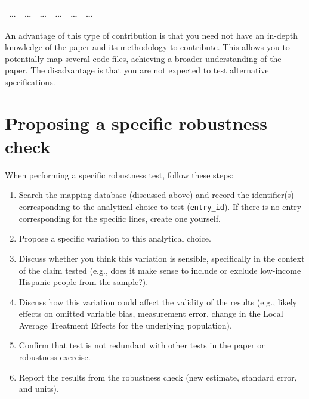 \documentclass[]{book}
\begin{document}
\begin{longtable}[]{@{}lllllll@{}}
\begin{minipage}[t]{0.07\columnwidth}
\ldots{}\strut
\end{minipage} & \begin{minipage}[t]{0.08\columnwidth}\raggedright
\ldots{}\strut
\end{minipage} & \begin{minipage}[t]{0.12\columnwidth}\raggedright
\ldots{}\strut
\end{minipage} & \begin{minipage}[t]{0.19\columnwidth}\raggedright
\ldots{}\strut
\end{minipage} & \begin{minipage}[t]{0.18\columnwidth}\raggedright
\ldots{}\strut
\end{minipage} & \begin{minipage}[t]{0.12\columnwidth}\raggedright
\ldots{}\strut
\end{minipage}\tabularnewline
\bottomrule
\end{longtable}

An advantage of this type of contribution is that you need not have an in-depth knowledge of the paper and its methodology to contribute. This allows you to potentially map several code files, achieving a broader understanding of the paper. The disadvantage is that you are not expected to test alternative specifications.

\hypertarget{proposing-a-specific-robustness-check}{%
\section{Proposing a specific robustness check}\label{proposing-a-specific-robustness-check}}

When performing a specific robustness test, follow these steps:

\begin{enumerate}
\def\labelenumi{\arabic{enumi}.}
\item
  Search the mapping database (discussed above) and record the identifier(s) corresponding to the analytical choice to test (\texttt{entry\_id}). If there is no entry corresponding for the specific lines, create one yourself.
\item
  Propose a specific variation to this analytical choice.
\item
  Discuss whether you think this variation is sensible, specifically in the context of the claim tested (e.g., does it make sense to include or exclude low-income Hispanic people from the sample?).
\item
  Discuss how this variation could affect the validity of the results (e.g., likely effects on omitted variable bias, measurement error, change in the Local Average Treatment Effects for the underlying population).
\item
  Confirm that test is not redundant with other tests in the paper or robustness exercise.
\item
  Report the results from the robustness check (new estimate, standard error, and units).
\end{enumerate}
\end{document}
